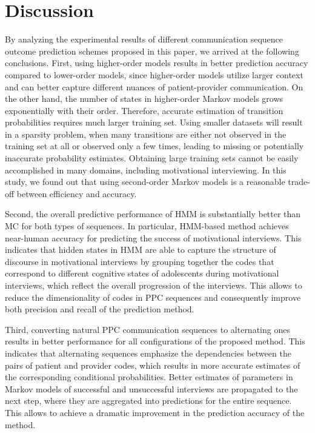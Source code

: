 \documentclass{amia_summit_2018}
\begin{document}
\section*{Discussion}
By analyzing the experimental results of different communication sequence outcome prediction schemes proposed in this paper, we arrived at the following conclusions. First, using higher-order models results in better prediction accuracy compared to lower-order models, since higher-order models utilize larger context and can better capture different nuances of patient-provider communication. On the other hand, the number of states in higher-order Markov models grows exponentially with their order. Therefore, accurate estimation of transition probabilities requires much larger training set. Using smaller datasets will result in a sparsity problem, when many transitions are either not observed in the training set at all or observed only a few times, leading to missing or potentially inaccurate probability estimates. Obtaining large training sets cannot be easily accomplished in many domains, including motivational interviewing. In this study, we found out that using second-order Markov models is a reasonable trade-off between efficiency and accuracy.  

Second, the overall predictive performance of HMM is substantially better than MC for both types of sequences. In particular, HMM-based method achieves near-human accuracy for predicting the success of motivational interviews. This indicates that hidden states in HMM are able to capture the structure of discourse in motivational interviews by grouping together the codes that correspond to different cognitive states of adolescents during motivational interviews, which reflect the overall progression of the interviews. This allows to reduce the dimensionality of codes in PPC sequences and consequently improve both precision and recall of the prediction method. 

Third, converting natural PPC communication sequences to alternating ones results in better performance for all configurations of the proposed method. This indicates that alternating sequences emphasize the dependencies between the pairs of patient and provider codes, which results in more accurate estimates of the corresponding conditional probabilities. Better estimates of parameters in Markov models of successful and unsuccessful interviews are propagated to the next step, where they are aggregated into predictions for the entire sequence. This allows to achieve a dramatic improvement in the prediction accuracy of the method. 
\end{document}

